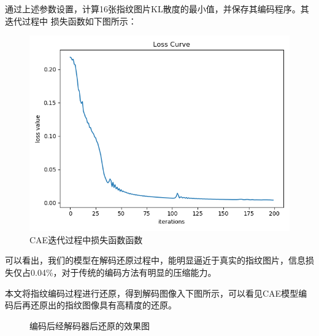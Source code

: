 \documentclass{whutmod}
\begin{document}
        通过上述参数设置，计算16张指纹图片KL散度的最小值，并保存其编码程序。其迭代过程中 损失函数如下图所示：
        	\begin{figure}[H]
        	\centering
        	\includegraphics[width=.6\textwidth]{figures/loss.png}
        	\caption{CAE迭代过程中损失函数函数}\label{loss}
        \end{figure}
    可以看出，我们的模型在解码还原过程中，能明显逼近于真实的指纹图片，信息损失仅占0.04\%，对于传统的编码方法有明显的压缩能力。
    
    本文将指纹编码过程进行还原，得到解码图像入下图所示，可以看见CAE模型编码后再还原出的指纹图像具有高精度的还原。
        			\begin{figure}[H]	
        	\centering
        	\caption{编码后经解码器后还原的效果图}
        	\label{zhiwen}
        \end{figure}
    
\end{document}
